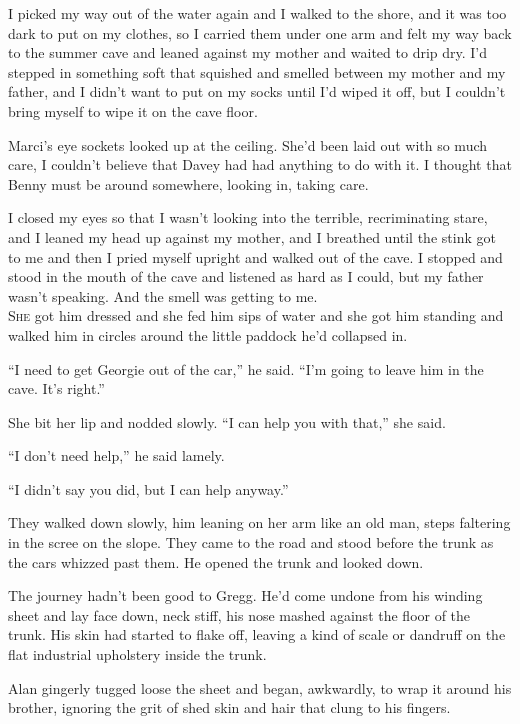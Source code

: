\documentclass{article}
\begin{document}
I picked my way out of the water again and I walked to the shore, and
it was too dark to put on my clothes, so I carried them under one arm
and felt my way back to the summer cave and leaned against my mother
and waited to drip dry.  I'd stepped in something soft that squished
and smelled between my mother and my father, and I didn't want to put
on my socks until I'd wiped it off, but I couldn't bring myself to
wipe it on the cave floor.

Marci's eye sockets looked up at the ceiling.  She'd been laid out
with so much care, I couldn't believe that Davey had had anything to
do with it.  I thought that Benny must be around somewhere, looking
in, taking care.

I closed my eyes so that I wasn't looking into the terrible,
recriminating stare, and I leaned my head up against my mother, and I
breathed until the stink got to me and then I pried myself upright and
walked out of the cave.  I stopped and stood in the mouth of the cave
and listened as hard as I could, but my father wasn't speaking.  And
the smell was getting to me.
\\
\lettrine[lines=3, lhang=.5, nindent=0pt, findent=2pt]{S}{he} got him dressed and she fed him sips of water and she got him
standing and walked him in circles around the little paddock he'd
collapsed in.

``I need to get Georgie out of the car,'' he said.  ``I'm going to
leave him in the cave.  It's right.''

She bit her lip and nodded slowly.  ``I can help you with that,'' she
said.

``I don't need help,'' he said lamely.

``I didn't say you did, but I can help anyway.''

They walked down slowly, him leaning on her arm like an old man, steps
faltering in the scree on the slope.  They came to the road and stood
before the trunk as the cars whizzed past them.  He opened the trunk
and looked down.

The journey hadn't been good to Gregg.  He'd come undone from his
winding sheet and lay face down, neck stiff, his nose mashed against
the floor of the trunk.  His skin had started to flake off, leaving a
kind of scale or dandruff on the flat industrial upholstery inside the
trunk.

Alan gingerly tugged loose the sheet and began, awkwardly, to wrap it
around his brother, ignoring the grit of shed skin and hair that clung
to his fingers.
\end{document}
